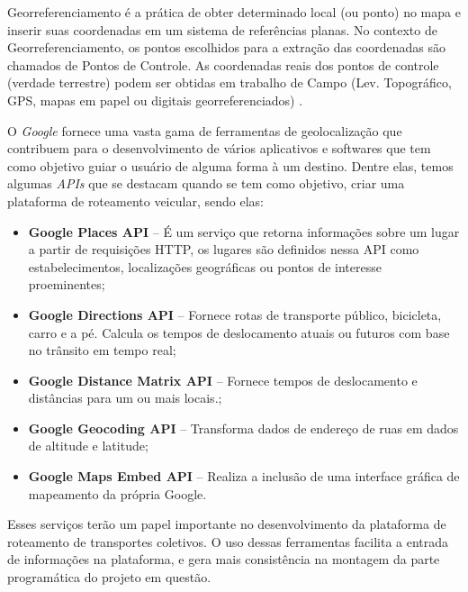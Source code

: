 Georreferenciamento é a prática de obter determinado local (ou ponto) no mapa e inserir suas coordenadas em um sistema de referências planas. No contexto de Georreferenciamento, os pontos escolhidos para a extração das coordenadas são chamados de Pontos de Controle. As coordenadas reais dos pontos de controle (verdade terrestre) podem ser obtidas em trabalho de Campo (Lev. Topográfico, GPS, mapas em papel ou digitais georreferenciados) \cite{georreferenciamento}.

O \emph{Google} fornece uma vasta gama de ferramentas de geolocalização que contribuem para o desenvolvimento de vários aplicativos e softwares que tem como objetivo guiar o usuário de alguma forma à um destino. Dentre elas, temos algumas \emph{APIs} que se destacam quando se tem como objetivo, criar uma plataforma de roteamento veicular, sendo elas:
\begin{itemize}
    \item \textbf{Google Places API} -- É um serviço que retorna informações sobre um lugar a partir de requisições HTTP,  os lugares são definidos nessa API como estabelecimentos, localizações geográficas ou pontos de interesse proeminentes;
    \item \textbf{Google Directions API} -- Fornece rotas de transporte público, bicicleta, carro e a pé. Calcula os tempos de deslocamento atuais ou futuros com base no trânsito em tempo real;
    \item \textbf{Google Distance Matrix API} -- Fornece tempos de deslocamento e distâncias para um ou mais locais.;
    \item \textbf{Google Geocoding API} -- Transforma dados de endereço de ruas em dados de altitude e latitude;
    \item \textbf{Google Maps Embed API} -- Realiza a inclusão de uma interface gráfica de mapeamento da própria Google.
\end{itemize}

Esses serviços terão um papel importante no desenvolvimento da plataforma de roteamento de transportes coletivos. O uso dessas ferramentas facilita a entrada de informações na plataforma, e gera mais consistência na montagem da parte programática do projeto em questão.


